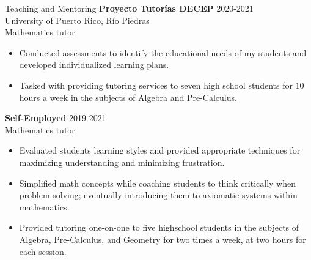 \documentclass{resume}
\begin{document}
\begin{rSection}{Teaching and Mentoring}
  \textbf{Proyecto Tutor\'ias DECEP} \hfill{2020-2021} \\
  University of Puerto Rico, R\'io Piedras \\
  Mathematics tutor
  \begin{itemize}
    \item[] Conducted assessments to identify the educational needs of my
      students and developed individualized learning plans.

    \item[] Tasked with providing tutoring services to seven high school
      students for $10$ hours a week in the subjects of Algebra and
      Pre-Calculus.
  \end{itemize}

  \textbf{Self-Employed} \hfill{2019-2021} \\
  Mathematics tutor

  \begin{itemize}
    \item[] Evaluated students learning styles and provided appropriate
      techniques for maximizing understanding and minimizing frustration.

    \item[] Simplified math concepts while coaching students to think
      critically when problem solving; eventually introducing them to
      axiomatic systems within mathematics.

    \item[] Provided tutoring one-on-one to five highschool students in the
      subjects of Algebra, Pre-Calculus, and Geometry for two times a
      week, at two hours for each session.
  \end{itemize}
\end{rSection}
\end{document}
